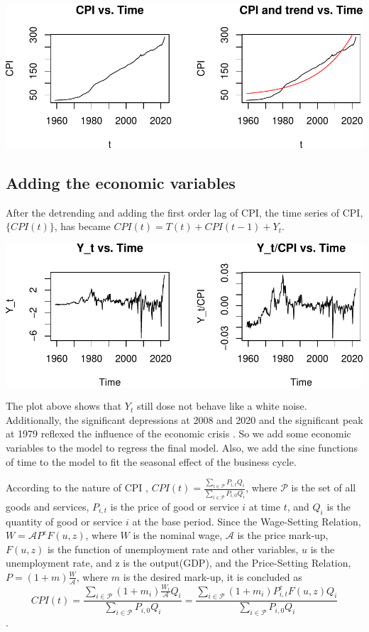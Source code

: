 \documentclass[
  man,floatsintext,
  man]{apa6}
\begin{document}
\includegraphics{stat429_group2_final_proj_files/figure-latex/unnamed-chunk-1-1.pdf}

\hypertarget{adding-the-economic-variables}{%
\subsection{Adding the economic variables}\label{adding-the-economic-variables}}

After the detrending and adding the first order lag of CPI, the time series of CPI, \(\{CPI(t)\}\), has became \(CPI(t) = T(t) + CPI(t-1) + Y_t\).

\includegraphics{stat429_group2_final_proj_files/figure-latex/unnamed-chunk-2-1.pdf}

The plot above shows that \(Y_t\) still dose not behave like a white noise.
Additionally, the significant depressions at 2008 and 2020 and the significant peak at 1979 reflexed the influence of the economic crisis\autocite{gross2019iran} \autocite{williams2010uncontrolled} \autocite{forbes_2019_strange_new_world}.
So we add some economic variables to the model to regress the final model.
Also, we add the sine functions of time to the model to fit the seasonal effect of the business cycle.

According to the nature of CPI \autocite{blanchard2004macroeconomics}, \(CPI(t) = \frac{\sum_{i \in \mathcal{P}} P_{i,t} Q_i}{\sum_{i \in \mathcal{P}} P_{i,0} Q_i}\), where \(\mathcal{P}\) is the set of all goods and services, \(P_{i,t}\) is the price of good or service \(i\) at time \(t\), and \(Q_i\) is the quantity of good or service \(i\) at the base period.
Since the Wage-Setting Relation, \(W = \mathcal{A} P^e F(u,z)\), where \(W\) is the nominal wage, \(\mathcal{A}\) is the price mark-up, \(F(u,z)\) is the function of unemployment rate and other variables, \(u\) is the unemployment rate, and z is the output(GDP), and the Price-Setting Relation, \(P = (1+m)\frac{W}{\mathcal{A}}\), where \(m\) is the desired mark-up,
it is concluded as
\[CPI(t) = \frac{\sum_{i \in \mathcal{P}} (1+m_i) \frac{W_i}{\mathcal{A}} Q_i}{\sum_{i \in \mathcal{P}} P_{i,0} Q_i} = \frac{\sum_{i \in \mathcal{P}} (1+m_i) P_{i,t}^e F(u,z) Q_i}{\sum_{i \in \mathcal{P}} P_{i,0} Q_i}\].
\end{document}
